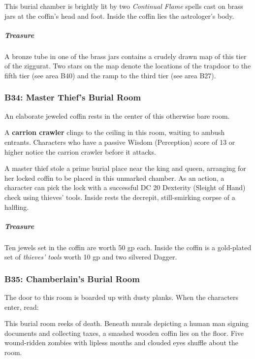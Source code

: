 \documentclass[10pt,a4paper,twoside,bg=print,twocolumn,openany,nodeprecatedcode]{dndbook}
\begin{document}
This burial chamber is brightly lit by two \textit{Continual Flame} spells cast on brass jars at the coffin's head and foot. Inside the coffin lies the astrologer's body.

\subparagraph{Treasure}
A bronze tube in one of the brass jars contains a crudely drawn map of this tier of the ziggurat. Two stars on the map denote the locations of the trapdoor to the fifth tier (see area B40) and the ramp to the third tier (see area B27).

\subsubsection{B34: Master Thief's Burial Room}
\begin{DndReadAloud}{}
An elaborate jeweled coffin rests in the center of this otherwise bare room.

\end{DndReadAloud}

A \textbf{carrion crawler} clings to the ceiling in this room, waiting to ambush entrants. Characters who have a passive Wisdom (Perception) score of 13 or higher notice the carrion crawler before it attacks.

A master thief stole a prime burial place near the king and queen, arranging for her locked coffin to be placed in this unmarked chamber. As an action, a character can pick the lock with a successful DC 20 Dexterity (Sleight of Hand) check using thieves' tools. Inside rests the decrepit, still-smirking corpse of a halfling.

\subparagraph{Treasure}
Ten jewels set in the coffin are worth 50 gp each. Inside the coffin is a gold-plated set of \textit{thieves' tools} worth 10 gp and two silvered Dagger.

\subsubsection{B35: Chamberlain's Burial Room}
The door to this room is boarded up with dusty planks. When the characters enter, read:

\begin{DndReadAloud}{}
This burial room reeks of death. Beneath murals depicting a human man signing documents and collecting taxes, a smashed wooden coffin lies on the floor. Five wound-ridden zombies with lipless mouths and clouded eyes shuffle about the room.

\end{DndReadAloud}
\end{document}
